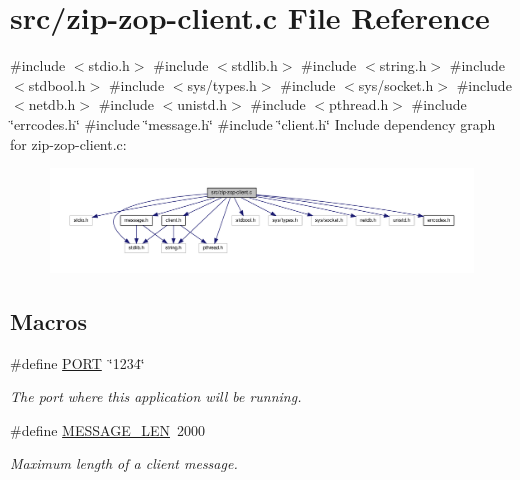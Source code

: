\hypertarget{zip-zop-client_8c}{}\section{src/zip-\/zop-\/client.c File Reference}
\label{zip-zop-client_8c}
{\ttfamily \#include $<$stdio.\+h$>$}\newline
{\ttfamily \#include $<$stdlib.\+h$>$}\newline
{\ttfamily \#include $<$string.\+h$>$}\newline
{\ttfamily \#include $<$stdbool.\+h$>$}\newline
{\ttfamily \#include $<$sys/types.\+h$>$}\newline
{\ttfamily \#include $<$sys/socket.\+h$>$}\newline
{\ttfamily \#include $<$netdb.\+h$>$}\newline
{\ttfamily \#include $<$unistd.\+h$>$}\newline
{\ttfamily \#include $<$pthread.\+h$>$}\newline
{\ttfamily \#include \char`\"{}errcodes.\+h\char`\"{}}\newline
{\ttfamily \#include \char`\"{}message.\+h\char`\"{}}\newline
{\ttfamily \#include \char`\"{}client.\+h\char`\"{}}\newline
Include dependency graph for zip-\/zop-\/client.c\+:\nopagebreak
\begin{figure}[H]
\begin{center}
\leavevmode
\includegraphics[width=350pt]{zip-zop-client_8c__incl}
\end{center}
\end{figure}
\subsection*{Macros}
\begin{DoxyCompactItemize}
\item 
\#define \hyperlink{zip-zop-client_8c_a614217d263be1fb1a5f76e2ff7be19a2}{P\+O\+RT}~\char`\"{}1234\char`\"{}
\begin{DoxyCompactList}\small\item\em The port where this application will be running. \end{DoxyCompactList}\item 
\#define \hyperlink{zip-zop-client_8c_aa2dfc63100e2bed7efb1b0cd09dea107}{M\+E\+S\+S\+A\+G\+E\+\_\+\+L\+EN}~2000
\begin{DoxyCompactList}\small\item\em Maximum length of a client message. \end{DoxyCompactList}\end{DoxyCompactItemize}
